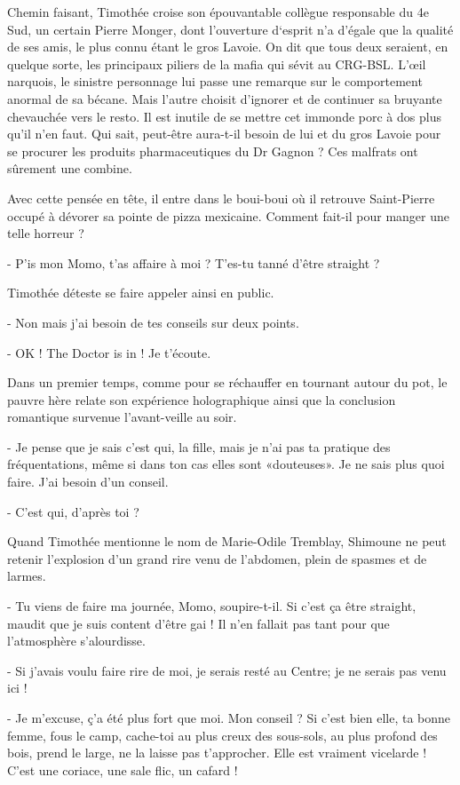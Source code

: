 Chemin faisant, Timothée croise son épouvantable collègue responsable du 4e Sud, un certain Pierre Monger, dont l’ouverture d‘esprit n’a d’égale que la qualité de ses amis, le plus connu étant le gros Lavoie. On dit que tous deux seraient, en quelque sorte, les principaux piliers de la mafia qui sévit au CRG-BSL. L’œil narquois, le sinistre personnage lui passe une remarque sur le comportement anormal de sa bécane. Mais l’autre choisit d’ignorer et de continuer sa bruyante chevauchée vers le resto. Il est inutile de se mettre cet immonde porc à dos plus qu’il n’en faut. Qui sait, peut-être aura-t-il besoin de lui et du gros Lavoie pour se procurer les produits pharmaceutiques du Dr Gagnon ? Ces malfrats ont sûrement une combine.

Avec cette pensée en tête, il entre dans le boui-boui où il retrouve Saint-Pierre occupé à dévorer sa pointe de pizza mexicaine. Comment fait-il pour manger une telle horreur ?

- P’is mon Momo, t’as affaire à moi ? T’es-tu tanné d’être straight ?

Timothée déteste se faire appeler ainsi en public.

- Non mais j’ai besoin de tes conseils sur deux points.

- OK ! The Doctor is in ! Je t’écoute.

Dans un premier temps, comme pour se réchauffer en tournant autour du pot, le pauvre hère relate son expérience holographique ainsi que la conclusion romantique survenue l’avant-veille au soir.

- Je pense que je sais c’est qui, la fille, mais je n’ai pas ta pratique des fréquentations, même si dans ton cas elles sont «douteuses». Je ne sais plus quoi faire. J’ai besoin d’un conseil.

- C’est qui, d’après toi ?

Quand Timothée mentionne le nom de Marie-Odile Tremblay, Shimoune ne peut retenir l’explosion d’un grand rire venu de l’abdomen, plein de spasmes et de larmes.

- Tu viens de faire ma journée, Momo, soupire-t-il. Si c’est ça être straight, maudit que je suis content d’être gai !
Il n’en fallait pas tant pour que l’atmosphère s’alourdisse.

- Si j’avais voulu faire rire de moi, je serais resté au Centre; je ne serais pas venu ici !

- Je m’excuse, ç’a été plus fort que moi. Mon conseil ? Si c’est bien elle, ta bonne femme, fous le camp, cache-toi au plus creux des sous-sols, au plus profond des bois, prend le large, ne la laisse pas t’approcher. Elle est vraiment vicelarde ! C’est une coriace, une sale flic, un cafard !

